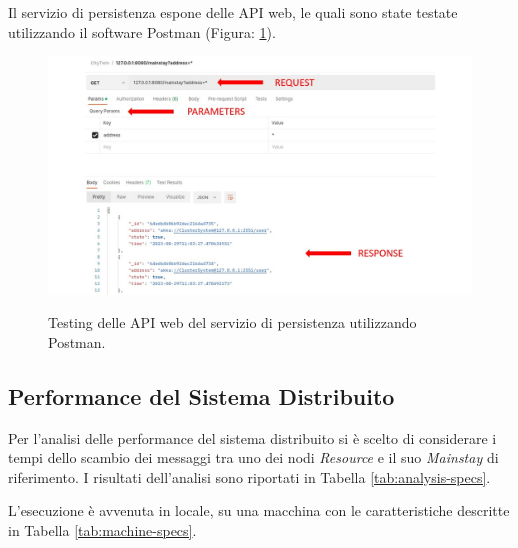 \documentclass[12pt]{article}
\begin{document}
Il servizio di persistenza espone delle API web, le quali sono state testate utilizzando il software Postman (Figura: \ref{fig:postman}).

\begin{figure}[H]
    \caption{Testing delle API web del servizio di persistenza utilizzando Postman.}
    \includegraphics[width=\textwidth]{../assets/images/postman.jpg}
    \label{fig:postman}
\end{figure}

\subsection{Performance del Sistema Distribuito}

Per l'analisi delle performance del sistema distribuito si è scelto di considerare i tempi dello scambio dei messaggi tra uno dei nodi \textit{Resource} e il suo \textit{Mainstay} di riferimento. I risultati dell'analisi sono riportati in Tabella \ref{tab:analysis-specs}.

L'esecuzione è avvenuta in locale, su una macchina con le caratteristiche descritte in Tabella \ref{tab:machine-specs}.
\end{document}

